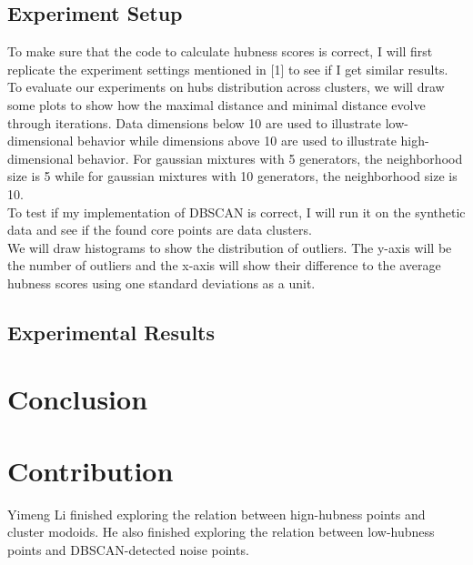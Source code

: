\documentclass[11pt]{article}
\begin{document}
\subsection{Experiment Setup}
To make sure that the code to calculate hubness scores is correct, I will first replicate the experiment settings mentioned in [1] to see if I get similar results.\\
To evaluate our experiments on hubs distribution across clusters, we will draw some plots to show how the maximal distance and minimal distance evolve through iterations. Data dimensions below 10 are used to illustrate low-dimensional behavior while dimensions above 10 are used to illustrate high-dimensional behavior. For gaussian mixtures with 5 generators, the neighborhood size is 5 while for gaussian mixtures with 10 generators, the neighborhood size is 10.\\
To test if my implementation of DBSCAN is correct, I will run it on the synthetic data and see if the found core points are data clusters.\\
We will draw histograms to show the distribution of outliers. The y-axis will be the number of outliers and the x-axis will show their difference to the average hubness scores using one standard deviations as a unit.\\

\subsection{Experimental Results}


\section{Conclusion}

\section{Contribution}
Yimeng Li finished exploring the relation between hign-hubness points and cluster modoids. He also finished exploring the relation between low-hubness points and DBSCAN-detected noise points.


\end{document}

